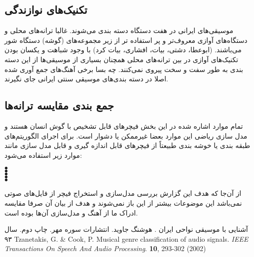 \subsection{تکنیک‌های نوازندگی}
موسیقی‌های ایرانی در هفت دستگاه دسته بندی می‌شوند. غالبا ترانه‌های محلی و دستگاه‌های آوازی معروف‌تر و پر استفاده تر از زیر مجموعه‌های (گوشه) دستگاه شور می‌باشند. (ابوعطا، دشتی، بیات، افشاری، بیات کرد) با وجود شباهت و یکسان بودن تکنیک‌های آوازی در بین ترانه‌های محلی همچنان بسیاری از موسیقی‌ها از این دسته بندی به طور سفت و سخت پیروی نمی‌کنند. چه بسا برخی آهنگ‌های جمع آوری شده اصلا در دسته بندی‌های موسیقی سنتی ایرانی جای نگیرند.
\subsection{جمع بندی مقایسه ترانه‌ها}
تمام موارد اشاره شده در این بخش فیچرهای قابل تشخیص با گوش انسان هستند و مدل سازی ریاضی این موارد بعضا غیرممکن یا دشوار است. برای اجرای الگوریتم‌های طبقه بندی یا خوشه بندی طبیعتاً از فیچرهای قابل اندازه گیری و قابل مدل سازی مانند موارد زیر استفاده می‌شود:
\begin{description}
    \item[$\bullet$] 
    \item[$\bullet$] 
    \item[$\bullet$] 
    \item[$\bullet$] 
    \item[$\bullet$]  
\end{description}
از آن‌جا که هدف این گزارش بررسی مدل‌سازی و استخراج فیچر از فایل‌های صوتی نمی‌باشد این موضوعات بیشتر از این باز نمی‌شوند و هدف از بیان آن صرفا مقایسه ادراک ما از آهنگ و مدل‌سازی آن‌ها بوده است. \cite{tzanetakis2002musical}

\begin{thebibliography}{99}
	 آشنایی با موسیقی نواحی ایران . هوشنگ جاوید. انتشارات سوره مهر. چاپ دوم. سال ۹۳
	\resetlatinfont
	Tzanetakis, G. \& Cook, P. Musical genre classification of audio signals. {\em IEEE Transactions On Speech And Audio Processing}. \textbf{10}, 293-302 (2002)
\end{thebibliography}